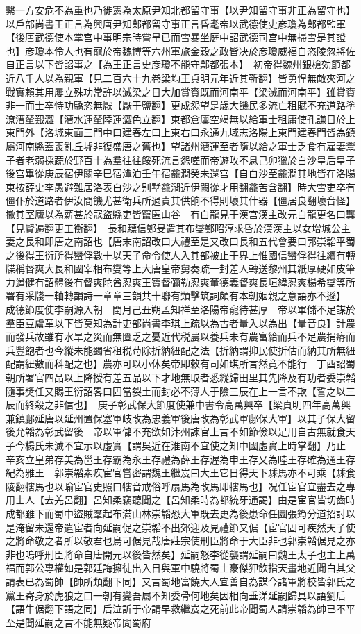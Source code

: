 繫一方安危不為重也乃徙憲為太原尹知北都留守事【以尹知留守事非正為留守也】以戶部尚書王正言為興唐尹知鄴都留守事正言昏耄帝以武德使史彦瓊為鄴都監軍【後唐武德使本掌宫中事明宗時嘗旱已而雪暴坐庭中詔武德司宫中無掃雪是其證也】彦瓊本伶人也有寵於帝魏博等六州軍旅金穀之政皆决於彦瓊威福自恣陵忽將佐自正言以下皆諂事之【為王正言史彦瓊不能守鄴都張本】　初帝得魏州銀槍効節都近八千人以為親軍【見二百六十九卷梁均王貞明元年近其靳翻】皆勇悍無敵夾河之戰實賴其用屢立殊功常許以滅梁之日大加賞賚既而河南平【梁滅而河南平】雖賞賚非一而士卒恃功驕恣無厭【厭于鹽翻】更成怨望是歲大饑民多流亡租賦不充道路塗潦漕輦艱澀【漕水運輦陸運澀色立翻】東都倉廩空竭無以給軍士租庸使孔謙日於上東門外【洛城東面三門中曰建春左曰上東右曰永通九域志洛陽上東門建春門皆為鎮屬河南縣蓋喪亂丘墟非復盛唐之舊也】望諸州漕運至者隨以給之軍士乏食有雇妻鬻子者老弱採蔬於野百十為羣往往餒死流言怨嗟而帝遊畋不息己卯獵於白沙皇后皇子後宫畢從庚辰宿伊關辛巳宿潭泊壬午宿龕澗癸未還宫【自白沙至龕澗其地皆在洛陽東按薛史李愚避難居洛表白沙之别墅龕澗近伊闕從才用翻龕苦含翻】時大雪吏卒有僵仆於道路者伊汝間饑尤甚衛兵所過責其供餉不得則壞其什器【僵居良翻壞音怪】撤其室廬以為薪甚於寇盜縣吏皆竄匿山谷　有白龍見于漢宫漢主改元白龍更名曰龔【見賢遍翻更工衡翻】　長和驃信鄭旻遣其布燮鄭昭淳求昏於漢漢主以女增城公主妻之長和即唐之南詔也【唐末南詔改曰大禮至是又改曰長和五代會要曰郭崇韜平蜀之後得王衍所得蠻俘數十以天子命令使人入其部被止于界上惟國信蠻俘得往續有轉牒稱督爽大長和國宰相布燮等上大唐皇帝舅奏疏一封差人轉送黎州其紙厚硬如皮筆力遒健有詔體後有督爽陀酋忍爽王寶督彌勒忍爽董德義督爽長垣緯忍爽楊希燮等所署有采牋一軸轉韻詩一章章三韻共十聯有類擊筑詞頗有本朝姻親之意語亦不遜】　成德節度使李嗣源入朝　閏月己丑朔孟知祥至洛陽帝寵待甚厚　帝以軍儲不足謀於羣臣豆盧革以下皆莫知為計吏部尚書李琪上疏以為古者量入以為出【量音良】計農而發兵故雖有水旱之災而無匱乏之憂近代税農以養兵未有農富給而兵不足農捐瘠而兵豐飽者也今縱未能蠲省租税苟除折納紐配之法【折納謂抑民使折估而納其所無紐配謂紐數而科配之也】農亦可以小休矣帝即敕有司如琪所言然竟不能行　丁酉詔蜀朝所署官四品以上降授有差五品以下才地無取者悉縱歸田里其先降及有功者委崇韜隨事奬任又賜王衍詔畧曰固當裂土而封必不薄人于險三辰在上一言不欺【誓之以三辰而終殺之非信也】　庚子彰武保大節度使兼中書令高萬興卒【梁貞明四年高萬興兼鎮鄜延唐以延州置保塞軍岐改為忠義軍後唐改為彰武軍鄜保大軍】以其子保大留後允韜為彰武留後　帝以軍儲不充欲如汴州諫官上言不如節儉以足用自古無就食天子今楊氏未滅不宜示以虛實【謂吳近在淮南不宜使之知中國虛實上時掌翻】乃止　辛亥立皇弟存美為邕王存霸為永王存禮為薛王存渥為申王存乂為睦王存確為通王存紀為雅王　郭崇韜素疾宦官嘗密謂魏王繼岌曰大王它日得天下騬馬亦不可乘【騬食陵翻犗馬也以喻宦官史照曰犗音戒俗呼扇馬為改馬即犗馬也】况任宦官宜盡去之專用士人【去羌呂翻】呂知柔竊聽聞之【呂知柔時為都統牙通謁】由是宦官皆切齒時成都雖下而蜀中盜賊羣起布滿山林崇韜恐大軍既去更為後患命任圜張筠分道招討以是淹留未還帝遣宦者向延嗣促之崇韜不出郊迎及見禮節又倨【宦官固可疾然天子使之將命敬之者所以敬君也烏可倨見哉唐莊宗使刑臣將命于大臣非也郭崇韜倨見之亦非也嗚呼刑臣將命自唐開元以後皆然矣】延嗣怒李從襲謂延嗣曰魏王太子也主上萬福而郭公專權如是郭廷誨擁徒出入日與軍中驍將蜀土豪傑狎飲指天畫地近聞白其父請表已為蜀帥【帥所類翻下同】又言蜀地富饒大人宜善自為謀今諸軍將校皆郭氏之黨王寄身於虎狼之口一朝有變吾屬不知委骨何地矣因相向垂涕延嗣歸具以語劉后【語牛倨翻下語之同】后泣訢于帝請早救繼岌之死前此帝聞蜀人請崇韜為帥已不平至是聞延嗣之言不能無疑帝閲蜀府